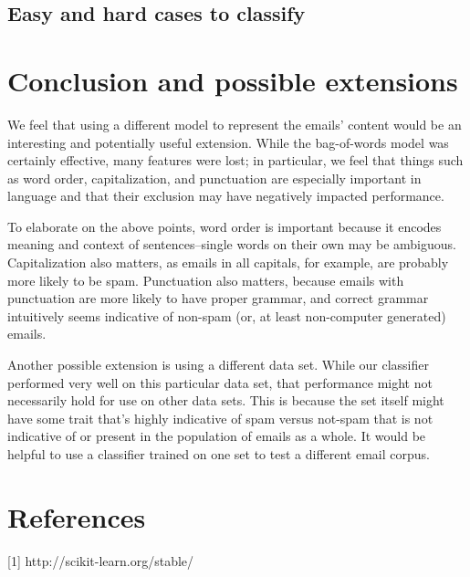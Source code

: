 \documentclass{article} %
\begin{document}
\subsection{Easy and hard cases to classify}

\section{Conclusion and possible extensions}

We feel that using a different model to represent the emails' content would be an interesting and potentially useful extension. While the bag-of-words model was certainly effective, many features were lost; in particular, we feel that things such as word order, capitalization, and punctuation are especially important in language and that their exclusion may have negatively impacted performance. 

To elaborate on the above points, word order is important because it encodes meaning and context of sentences--single words on their own may be ambiguous. Capitalization also matters, as emails in all capitals, for example, are probably more likely to be spam. Punctuation also matters, because emails with punctuation are more likely to have proper grammar, and correct grammar intuitively seems indicative of non-spam (or, at least non-computer generated) emails. 

Another possible extension is using a different data set. While our classifier performed very well on this particular data set, that performance might not necessarily hold for use on other data sets. This is because the set itself might have some trait that's highly indicative of spam versus not-spam that is not indicative of or present in the population of emails as a whole. It would be helpful to use a classifier trained on one set to test a different email corpus. 

\section{References}

[1] http://scikit-learn.org/stable/
\end{document}
